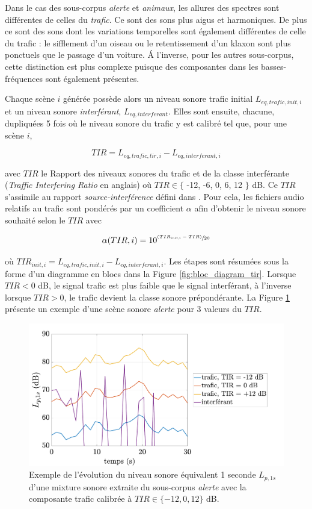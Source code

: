 Dans le cas des sous-corpus \textit{alerte} et \textit{animaux}, les allures des spectres sont différentes de celles du \textit{trafic}. Ce sont des sons plus aigus et harmoniques. De plus ce sont des sons dont les variations temporelles sont également différentes de celle du trafic : le sifflement d'un oiseau ou le retentissement d'un klaxon sont plus ponctuels que le passage d'un voiture. \'A l'inverse, pour les autres sous-corpus, cette distinction est plus complexe puisque des composantes dans les basses-fréquences sont également présentes.

Chaque scène $i$ générée possède alors un niveau sonore trafic initial $L_{eq,trafic,init,i}$ et un niveau sonore \textit{interférant}, $L_{eq,interferant}$. Elles sont ensuite, chacune, dupliquées 5 fois où le niveau sonore du trafic y est calibré tel que, pour une scène $i$, 

\begin{equation}
TIR = L_{eq,trafic, tir, i} - L_{eq,interferant, i}
\end{equation}

avec $TIR$ le Rapport des niveaux sonores du trafic et de la classe interférante (\textit{Traffic Interfering Ratio} en anglais) où $TIR \in \lbrace$ -12, -6, 0, 6, 12 $\rbrace$ dB. Ce $TIR$ s'assimile au rapport \textit{source-interférence} défini dans \cite{vincent2006performance}. Pour cela, les fichiers audio relatifs au trafic sont pondérés par un coefficient $\alpha$ afin d'obtenir le niveau sonore souhaité selon le $TIR$ avec

\begin{equation}
\alpha(TIR,i) = 10^{\sfrac{(TIR_{init,i}-TIR)}{20}}
\end{equation}

où $TIR_{init,i} = L_{eq,trafic,init,i}-L_{eq,interferant,i}$. Les étapes sont résumées sous la forme d'un diagramme en blocs dans la Figure \ref{fig:bloc_diagram_tir}. Lorsque $TIR < 0$ dB, le signal trafic est plus faible que le signal interférant, à l'inverse lorsque $TIR>0$, le trafic devient la classe sonore prépondérante. La Figure \ref{fig:exemple_TIR} présente un exemple d'une scène sonore \textit{alerte} pour 3 valeurs du $TIR$.\\

\begin{figure}[ht]
\centering
\includegraphics[width=0.7\linewidth]{./figures/NMF/Lp_TIR.pdf}
\caption{Exemple de l'évolution du niveau sonore équivalent 1 seconde $L_{p,1s}$ d'une mixture sonore extraite du sous-corpus \textit{alerte} avec la composante trafic calibrée à $TIR \in \lbrace-12, 0, 12\rbrace$ dB.}
\label{fig:exemple_TIR}
\end{figure}


